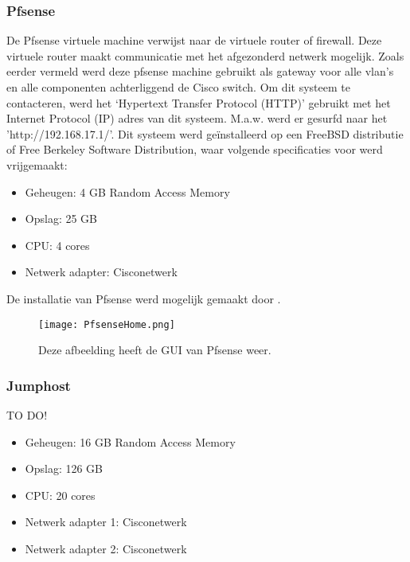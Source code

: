 \begin{itemize}
\subsubsection{Pfsense}
De Pfsense virtuele machine verwijst naar de virtuele router of firewall. Deze virtuele router maakt communicatie met het afgezonderd netwerk mogelijk. Zoals eerder vermeld werd deze pfsense machine gebruikt  als gateway voor alle vlan’s en alle componenten achterliggend de Cisco switch.
\newline
\newline
Om dit systeem te contacteren, werd het ‘Hypertext Transfer Protocol (HTTP)’ gebruikt met het Internet Protocol (IP) adres van dit systeem. M.a.w. werd er gesurfd naar het 'http://192.168.17.1/'.
\newline
\newline
Dit systeem werd geïnstalleerd op een FreeBSD distributie of Free Berkeley Software Distribution, waar volgende specificaties voor werd vrijgemaakt: 

\begin{itemize}
	\item Geheugen: 4 GB Random Access Memory
	\item Opslag: 25 GB
	\item CPU: 4 cores
	\item Netwerk adapter: Cisco\textunderscore netwerk
\end{itemize}
De installatie van Pfsense werd mogelijk gemaakt door \cite{Pfsense_InstallationGuide}.

\begin{figure}[H]
	\centering
	\texttt{[image: PfsenseHome.png]}
	\caption{Deze afbeelding heeft de GUI van Pfsense weer. }
\end{figure}

\subsubsection{Jumphost}
TO DO!

\begin{itemize}
	\item Geheugen: 16 GB Random Access Memory
	\item Opslag: 126 GB
	\item CPU: 20 cores
	\item Netwerk adapter 1: Cisco\textunderscore netwerk
	\item Netwerk adapter 2: Cisco\textunderscore netwerk
\end{itemize}


\end{itemize}
